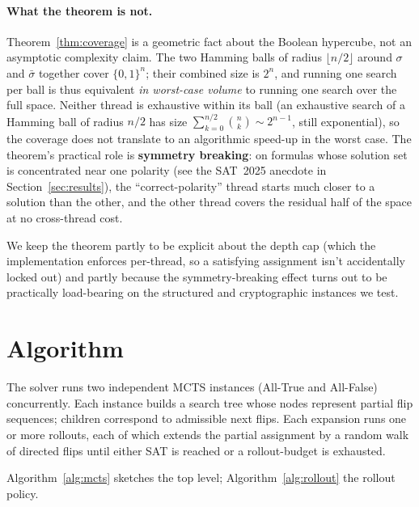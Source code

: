 \documentclass[11pt]{article}
\begin{document}
\paragraph{What the theorem is not.}
Theorem~\ref{thm:coverage} is a geometric fact about the Boolean
hypercube, not an asymptotic complexity claim. The two Hamming balls
of radius $\lfloor n/2 \rfloor$ around $\sigma$ and $\bar\sigma$
together cover $\{0,1\}^n$; their combined size is $2^n$, and running
one search per ball is thus equivalent \emph{in worst-case volume} to
running one search over the full space. Neither thread is exhaustive
within its ball (an exhaustive search of a Hamming ball of radius
$n/2$ has size $\sum_{k=0}^{n/2} \binom{n}{k} \sim 2^{n-1}$, still
exponential), so the coverage does not translate to an algorithmic
speed-up in the worst case. The theorem's practical role is
\textbf{symmetry breaking}: on formulas whose solution set is
concentrated near one polarity (see the SAT~2025 anecdote in
Section~\ref{sec:results}), the ``correct-polarity'' thread starts
much closer to a solution than the other, and the other thread
covers the residual half of the space at no cross-thread cost.

We keep the theorem partly to be explicit about the depth cap
(which the implementation enforces per-thread, so a satisfying
assignment isn't accidentally locked out) and partly because the
symmetry-breaking effect turns out to be practically load-bearing
on the structured and cryptographic instances we test.

\section{Algorithm}
\label{sec:algorithm}

The solver runs two independent MCTS instances (All-True and All-False)
concurrently. Each instance builds a search tree whose nodes represent
partial flip sequences; children correspond to admissible next flips.
Each expansion runs one or more rollouts, each of which extends the
partial assignment by a random walk of directed flips until either SAT
is reached or a rollout-budget is exhausted.

Algorithm~\ref{alg:mcts} sketches the top level;
Algorithm~\ref{alg:rollout} the rollout policy.
\end{document}
